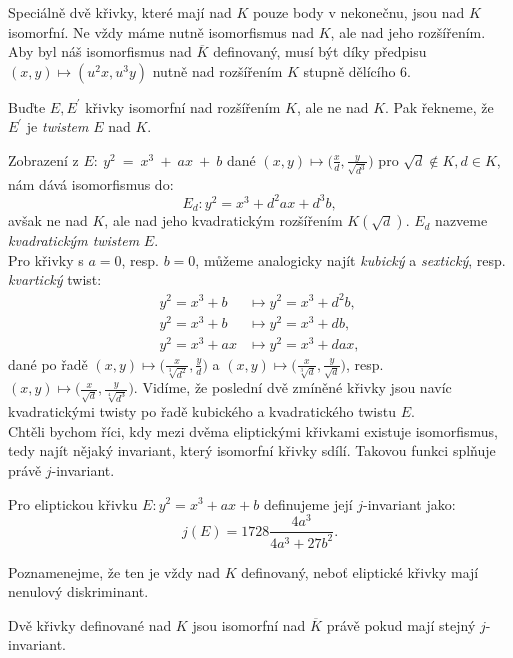 \documentclass [12pt]{report}
\begin{document}
Speciálně dvě křivky, které mají nad $K$ pouze body v nekonečnu, jsou nad $K$ isomorfní. Ne vždy máme nutně isomorfismus nad $K$, ale nad jeho rozšířením. Aby byl náš isomorfismus nad $\overline{K}$ definovaný, musí být díky předpisu $(x,y) \mapsto (u^2 x, u^3 y)$ nutně nad rozšířením $K$ stupně dělícího $6$.
\begin{definice}
Buďte $E,E^\prime$ křivky isomorfní nad rozšířením $K$, ale ne nad $K$. Pak řekneme, že $E^\prime$ je \textit{twistem} $E$ nad $K$.
\end{definice}
Zobrazení z  $E:~y^2~=~x^3~+~ax~+~b$ dané $(x,y) \mapsto \big(\frac{x}{d}, \frac{y}{\sqrt{d^3}}\big) $ pro $\sqrt{d} \not \in K, d \in K$, nám dává isomorfismus do:
\begin{equation*}
E_d : y^2 = x^3 + d^2 a x + d^3 b,
\end{equation*}
avšak ne nad $K$, ale nad jeho kvadratickým rozšířením $K(\sqrt{d})$. $E_d$ nazveme \textit{kvadratickým twistem} $E$.\\

Pro křivky s $a=0$, resp. $b=0$, můžeme analogicky najít \textit{kubický} a \textit{sextický}, resp. \textit{kvartický} twist:
\begin{align*}
y^2 = x^3 + b &\mapsto y^2 = x^3 + d^2 b ,\\
y^2 = x^3 + b &\mapsto y^2 = x^3 + d b, \\
y^2 = x^3 +ax &\mapsto y^2 = x^3 + d ax ,
\end{align*}
dané po řadě $(x,y)  \mapsto \big(\frac{x}{\sqrt[3]{d^2}}, \frac{y}{d}\big)$ a $(x,y)  \mapsto \big(\frac{x}{\sqrt[3]{d}}, \frac{y}{\sqrt{d}}\big)$, resp. $(x,y)  \mapsto \big(\frac{x}{\sqrt{d}}, \frac{y}{\sqrt[4]{d^3}}\big)$. Vidíme, že poslední dvě zmíněné křivky jsou navíc kvadratickými twisty po řadě kubického a kvadratického twistu $E$.\\


Chtěli bychom říci, kdy mezi dvěma eliptickými křivkami existuje isomorfismus, tedy najít nějaký invariant, který isomorfní křivky sdílí. Takovou funkci splňuje právě $j$-invariant.

\begin{definice}
Pro eliptickou křivku $E: y^2 = x^3 + ax + b$ definujeme její $j$-invariant jako:
\begin{equation*}
j(E) = 1728 \frac{4a^3}{4a^3+27b^2}.
\end{equation*}
\end{definice}
Poznamenejme, že ten je vždy nad $K$ definovaný, neboť eliptické křivky mají nenulový diskriminant.
\begin{veta}
Dvě křivky definované nad $K$ jsou isomorfní nad $\overline{K}$ právě pokud mají stejný $j$-invariant.
\end{veta}
\end{document}
